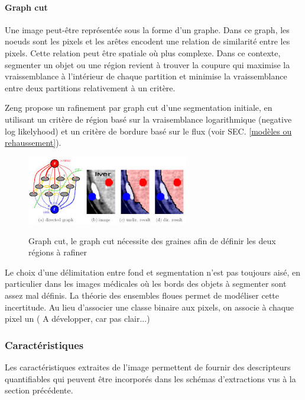 \paragraph{Graph cut}

Une image peut-être représentée sous la forme d'un graphe. Dans ce graph, les noeuds sont les pixels et les arêtes encodent une relation de similarité entre les pixels. Cette relation peut être spatiale où plus complexe. Dans ce contexte, segmenter un objet ou une région revient à trouver la coupure qui maximise la vraissemblance à l'intérieur de chaque partition et minimise la vraissemblance entre deux partitions relativement à un critère.

Zeng \cite{Zeng2017_liver_oof_graph_cut} propose un rafinement par graph cut d'une segmentation initiale, en utilisant un critère de région basé sur la vraisemblance logarithmique (negative log likelyhood) et un critère de bordure basé sur le flux (voir SEC. \ref{modèles ou rehaussement}).

\begin{figure}
  \centering
  \includegraphics[height=3cm]{Images/graph_cut.jpeg}
  \label{fig:Graph cut}
  \caption{Graph cut, le graph cut nécessite des graines afin de définir les deux régions à rafiner}
\end{figure}

Le choix d'une délimitation entre fond et segmentation n'est pas toujours aisé, en particulier dans les images médicales où les bords des objets à segmenter sont assez mal définis. La théorie des ensembles floues permet de modéliser cette incertitude. Au lieu d'associer une classe binaire aux pixels, on associe à chaque pixel un ( A développer, car pas clair...)

\cite{Zhang2018_liver_fuzzy_connectedness}
\cite{Caponetti2014_fuzzy_morphology}
\cite{Radojevic2015_fuzzy_logic}
\cite{Sigurosson2014_retinal_morpho_fuzzy}

\subsubsection{Caractéristiques}

Les caractéristiques extraites de l'image permettent de fournir des descripteurs quantifiables qui peuvent être incorporés dans les schémas d'extractions vus à la section précédente.

